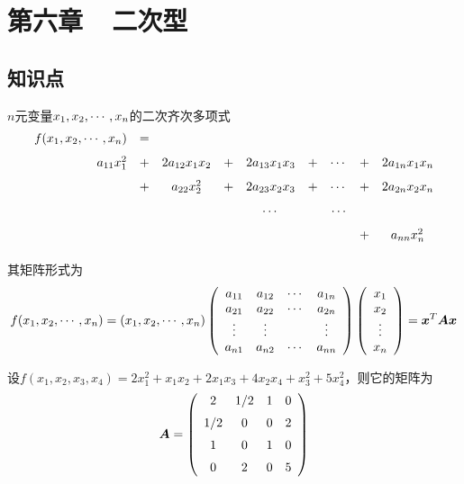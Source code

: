 \section{第六章~~二次型}

\subsection{知识点}

\begin{frame}
  
  \begin{dingyi}
    $n$元变量$x_1,x_2,\cdots,x_n$的二次齐次多项式
    $$
    \begin{array}{rcccccccc}
      f(x_1,x_2,\cdots,x_n) &=& \\[0.1in]
      a_{11}x_1^2&+&2a_{12}x_1x_2&+&2a_{13}x_1x_3&+&\cdots&+&2a_{1n}x_1x_n\\[0.1in]
                         &+&a_{22}x_2^2&+&2a_{23}x_2x_3&+&\cdots&+&2a_{2n}x_2x_n\\[0.1in]
                         &&&&\cdots&&\cdots\\[0.1in]
                         &&&&&&&+&a_{nn}x_n^2\\[0.1in]
    \end{array}
    $$
    其矩阵形式为
    $$
    f(x_1,x_2,\cdots,x_n)=   (x_1,x_2,\cdots,x_n)\left(
      \begin{array}{cccc}
        a_{11}&a_{12}&\cdots&a_{1n}\\
        a_{21}&a_{22}&\cdots&a_{2n}\\
        \vdots&\vdots&&\vdots\\
        a_{n1}&a_{n2}&\cdots&a_{nn}\\
      \end{array}
    \right)\left(
      \begin{array}{c}
        x_1\\
        x_2\\
        \vdots\\
        x_n
      \end{array}\right) = {\boldsymbol{x}}^T\boldsymbol{A}{\boldsymbol{x}}
    $$
  \end{dingyi}
  
\end{frame}




\begin{frame}
  
  \begin{li}
    设$f(x_1,x_2,x_3,x_4)=2x_1^2+x_1x_2+2x_1x_3+4x_2x_4+x_3^2+5x_4^2$，则它的矩阵为
    $$
    \boldsymbol{A}=\left(
      \begin{array}{cccc}
        2&\displaystyle1/2&1&0\\[0.2cm]
        \displaystyle1/2&0&0&2\\[0.2cm]
        1&0&1&0\\[0.2cm]
        0&2&0&5
      \end{array}
    \right)
    $$
  \end{li}
  
\end{frame}


